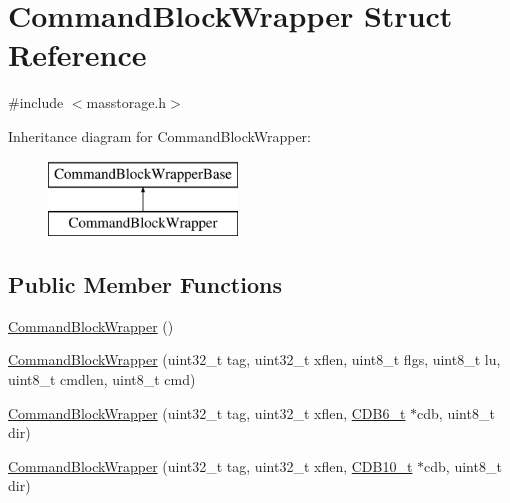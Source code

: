 \hypertarget{struct_command_block_wrapper}{\section{\-Command\-Block\-Wrapper \-Struct \-Reference}
\label{struct_command_block_wrapper}
}


{\ttfamily \#include $<$masstorage.\-h$>$}

\-Inheritance diagram for \-Command\-Block\-Wrapper\-:\begin{figure}[H]
\begin{center}
\leavevmode
\includegraphics[height=2.000000cm]{struct_command_block_wrapper}
\end{center}
\end{figure}
\subsection*{\-Public \-Member \-Functions}
\begin{DoxyCompactItemize}
\item 
\hyperlink{struct_command_block_wrapper_afc172d7a8531a20ac0ff37bd43ff9335}{\-Command\-Block\-Wrapper} ()
\item 
\hyperlink{struct_command_block_wrapper_aed4fbab705f9d412f5f436b8b4ad1b18}{\-Command\-Block\-Wrapper} (uint32\-\_\-t tag, uint32\-\_\-t xflen, uint8\-\_\-t flgs, uint8\-\_\-t lu, uint8\-\_\-t cmdlen, uint8\-\_\-t cmd)
\item 
\hyperlink{struct_command_block_wrapper_a3e59ab853c6091430a6ccf60845c6822}{\-Command\-Block\-Wrapper} (uint32\-\_\-t tag, uint32\-\_\-t xflen, \hyperlink{masstorage_8h_a56ab0baf4e98a591274bf8d1acf96d85}{\-C\-D\-B6\-\_\-t} $\ast$cdb, uint8\-\_\-t dir)
\item 
\hyperlink{struct_command_block_wrapper_a66833cea74ea81da389cc54cc78f3013}{\-Command\-Block\-Wrapper} (uint32\-\_\-t tag, uint32\-\_\-t xflen, \hyperlink{masstorage_8h_af952fd9270407996656ba95772511002}{\-C\-D\-B10\-\_\-t} $\ast$cdb, uint8\-\_\-t dir)
\end{DoxyCompactItemize}
